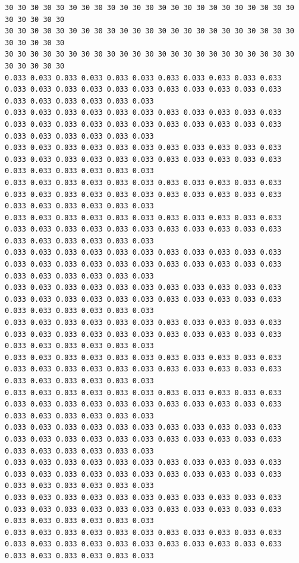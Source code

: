 \begin{lstlisting}[caption= Input file for 4 well example , label=lst:wellfield]
30 30 30 30 30 30 30 30 30 30 30 30 30 30 30 30 30 30 30 30 30 30 30 30 30 30 30 30
30 30 30 30 30 30 30 30 30 30 30 30 30 30 30 30 30 30 30 30 30 30 30 30 30 30 30 30
30 30 30 30 30 30 30 30 30 30 30 30 30 30 30 30 30 30 30 30 30 30 30 30 30 30 30 30
0.033 0.033 0.033 0.033 0.033 0.033 0.033 0.033 0.033 0.033 0.033 0.033 0.033 0.033 0.033 0.033 0.033 0.033 0.033 0.033 0.033 0.033 0.033 0.033 0.033 0.033 0.033 0.033
0.033 0.033 0.033 0.033 0.033 0.033 0.033 0.033 0.033 0.033 0.033 0.033 0.033 0.033 0.033 0.033 0.033 0.033 0.033 0.033 0.033 0.033 0.033 0.033 0.033 0.033 0.033 0.033
0.033 0.033 0.033 0.033 0.033 0.033 0.033 0.033 0.033 0.033 0.033 0.033 0.033 0.033 0.033 0.033 0.033 0.033 0.033 0.033 0.033 0.033 0.033 0.033 0.033 0.033 0.033 0.033
0.033 0.033 0.033 0.033 0.033 0.033 0.033 0.033 0.033 0.033 0.033 0.033 0.033 0.033 0.033 0.033 0.033 0.033 0.033 0.033 0.033 0.033 0.033 0.033 0.033 0.033 0.033 0.033
0.033 0.033 0.033 0.033 0.033 0.033 0.033 0.033 0.033 0.033 0.033 0.033 0.033 0.033 0.033 0.033 0.033 0.033 0.033 0.033 0.033 0.033 0.033 0.033 0.033 0.033 0.033 0.033
0.033 0.033 0.033 0.033 0.033 0.033 0.033 0.033 0.033 0.033 0.033 0.033 0.033 0.033 0.033 0.033 0.033 0.033 0.033 0.033 0.033 0.033 0.033 0.033 0.033 0.033 0.033 0.033
0.033 0.033 0.033 0.033 0.033 0.033 0.033 0.033 0.033 0.033 0.033 0.033 0.033 0.033 0.033 0.033 0.033 0.033 0.033 0.033 0.033 0.033 0.033 0.033 0.033 0.033 0.033 0.033
0.033 0.033 0.033 0.033 0.033 0.033 0.033 0.033 0.033 0.033 0.033 0.033 0.033 0.033 0.033 0.033 0.033 0.033 0.033 0.033 0.033 0.033 0.033 0.033 0.033 0.033 0.033 0.033
0.033 0.033 0.033 0.033 0.033 0.033 0.033 0.033 0.033 0.033 0.033 0.033 0.033 0.033 0.033 0.033 0.033 0.033 0.033 0.033 0.033 0.033 0.033 0.033 0.033 0.033 0.033 0.033
0.033 0.033 0.033 0.033 0.033 0.033 0.033 0.033 0.033 0.033 0.033 0.033 0.033 0.033 0.033 0.033 0.033 0.033 0.033 0.033 0.033 0.033 0.033 0.033 0.033 0.033 0.033 0.033
0.033 0.033 0.033 0.033 0.033 0.033 0.033 0.033 0.033 0.033 0.033 0.033 0.033 0.033 0.033 0.033 0.033 0.033 0.033 0.033 0.033 0.033 0.033 0.033 0.033 0.033 0.033 0.033
0.033 0.033 0.033 0.033 0.033 0.033 0.033 0.033 0.033 0.033 0.033 0.033 0.033 0.033 0.033 0.033 0.033 0.033 0.033 0.033 0.033 0.033 0.033 0.033 0.033 0.033 0.033 0.033
0.033 0.033 0.033 0.033 0.033 0.033 0.033 0.033 0.033 0.033 0.033 0.033 0.033 0.033 0.033 0.033 0.033 0.033 0.033 0.033 0.033 0.033 0.033 0.033 0.033 0.033 0.033 0.033
0.033 0.033 0.033 0.033 0.033 0.033 0.033 0.033 0.033 0.033 0.033 0.033 0.033 0.033 0.033 0.033 0.033 0.033 0.033 0.033 0.033 0.033 0.033 0.033 0.033 0.033 0.033 0.033

\end{lstlisting}
